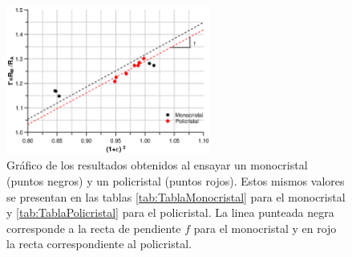 \documentclass[a4paper,12pt,fleqn,twoside,openany]{book}
\begin{document}
  


 \begin{figure}
 \centering
 \includegraphics[width=0.6\textwidth]{Img/Resultados/Resistencia/PoliMono2.eps}
 \caption{Gráfico de los resultados obtenidos al ensayar un monocristal (puntos negros) y un policristal (puntos rojos). Estos mismos valores se presentan en las tablas \ref{tab:TablaMonocristal} para el monocristal y \ref{tab:TablaPolicristal} para el policristal. La linea punteada negra corresponde a la recta de pendiente $f$ para el monocristal y en rojo la recta correspondiente al policristal.} 
 \label{fig:PoliMono}
 \end{figure}

%     
\end{document}
